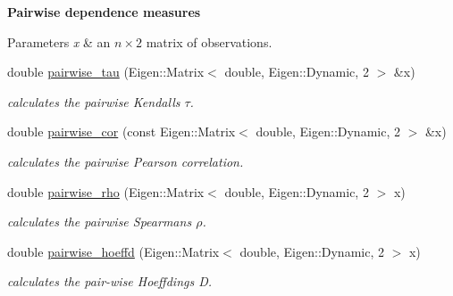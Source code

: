 \begin{Indent}{\bf Pairwise dependence measures}\par
{\em 
\begin{DoxyParams}{Parameters}
{\em x} & an $ n \times 2 $ matrix of observations. \\
\hline
\end{DoxyParams}
}\begin{DoxyCompactItemize}
\item 
double \hyperlink{namespacevinecopulib_1_1tools__stats_a48d674c978d8a9b657b3ab82ed42de4b}{pairwise\+\_\+tau} (Eigen\+::\+Matrix$<$ double, Eigen\+::\+Dynamic, 2 $>$ \&x)\hypertarget{namespacevinecopulib_1_1tools__stats_a48d674c978d8a9b657b3ab82ed42de4b}{}\label{namespacevinecopulib_1_1tools__stats_a48d674c978d8a9b657b3ab82ed42de4b}

\begin{DoxyCompactList}\small\item\em calculates the pairwise Kendall\textquotesingle{}s $ \tau $. \end{DoxyCompactList}\item 
double \hyperlink{namespacevinecopulib_1_1tools__stats_ad076513f9a531a015bb0eaff098a8271}{pairwise\+\_\+cor} (const Eigen\+::\+Matrix$<$ double, Eigen\+::\+Dynamic, 2 $>$ \&x)\hypertarget{namespacevinecopulib_1_1tools__stats_ad076513f9a531a015bb0eaff098a8271}{}\label{namespacevinecopulib_1_1tools__stats_ad076513f9a531a015bb0eaff098a8271}

\begin{DoxyCompactList}\small\item\em calculates the pairwise Pearson correlation. \end{DoxyCompactList}\item 
double \hyperlink{namespacevinecopulib_1_1tools__stats_af45a0930d65c0392e35deab25f687711}{pairwise\+\_\+rho} (Eigen\+::\+Matrix$<$ double, Eigen\+::\+Dynamic, 2 $>$ x)\hypertarget{namespacevinecopulib_1_1tools__stats_af45a0930d65c0392e35deab25f687711}{}\label{namespacevinecopulib_1_1tools__stats_af45a0930d65c0392e35deab25f687711}

\begin{DoxyCompactList}\small\item\em calculates the pairwise Spearman\textquotesingle{}s $ \rho $. \end{DoxyCompactList}\item 
double \hyperlink{namespacevinecopulib_1_1tools__stats_adda97526e428173da49899ef449560cf}{pairwise\+\_\+hoeffd} (Eigen\+::\+Matrix$<$ double, Eigen\+::\+Dynamic, 2 $>$ x)\hypertarget{namespacevinecopulib_1_1tools__stats_adda97526e428173da49899ef449560cf}{}\label{namespacevinecopulib_1_1tools__stats_adda97526e428173da49899ef449560cf}

\begin{DoxyCompactList}\small\item\em calculates the pair-\/wise Hoeffding\textquotesingle{}s D. \end{DoxyCompactList}\end{DoxyCompactItemize}
\end{Indent}
